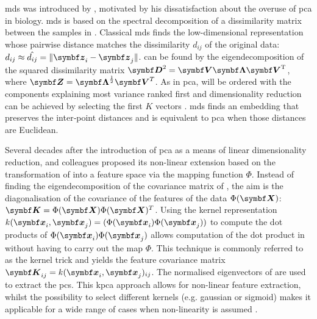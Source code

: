 \gls{mds} was introduced by \citet{Gower1966}, motivated by his dissatisfaction about the overuse of \gls{pca} in biology. \gls{mds} is based on the spectral decomposition of a dissimilarity matrix  between the samples in . Classical \gls{mds} finds the low-dimensional representation  whose pairwise distance matches the dissimilarity \(d_{ij}\) of the original data: \(d_{ij} \approx \hat{d_{ij}} = \lVert \matsub{z}{i} - \matsub{z}{j}\rVert \).  can be found by the eigendecomposition of the squared dissimilarity matrix \(\matsup{D}{2} = \mat{V}\mat{\Lambda}\matsup{V}{T}\), where \(\mat{Z}=\mat{\Lambda}^\frac{1}{2}\mat{V}^T\). As in \gls{pca},  will be ordered with the components explaining most variance ranked first and dimensionality reduction can be achieved by selecting the first \(K\) vectors \citep{Gower1966}. \gls{mds} finds an embedding that preserves the inter‐point distances and is equivalent to \gls{pca} when those distances are Euclidean.

Several decades after the introduction of \gls{pca} as a means of linear dimensionality reduction, \citet{Schoelkopf1998} and colleagues proposed its non-linear extension based on the transformation of  into a feature space  via the mapping function  \(\Phi\). Instead of finding the eigendecomposition of the covariance matrix of , the aim is the diagonalisation of the covariance  of the features of the data \(\Phi(\mat{X})\): \(\mat{K} = \Phi(\mat{X})\Phi(\mat{X})^T\). Using the kernel representation \(k(\matsub{x}{i}, \matsub{x}{j}) = (\Phi(\matsub{x}{i})\Phi(\matsub{x}{j}))\) to compute the dot products of \(\Phi(\matsub{x}{i})\Phi(\matsub{x}{j})\) allows computation of the dot product in  without having to carry out the map \(\Phi\). This technique is commonly referred to as the kernel trick and yields the feature covariance matrix \(\matsub{K}{ij} = k(\matsub{x}{i}, \matsub{x}{j})_{ij}\). The normalised eigenvectors of  are used to extract the \glspl{pc}. This \gls{kpca} approach allows for non-linear feature extraction, whilst the possibility to select different kernels (e.g. gaussian or sigmoid) makes it applicable for a wide range of cases when non-linearity is assumed \citep{Schoelkopf1998}.

